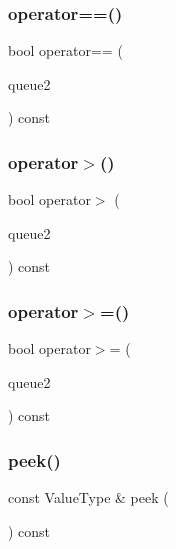 \mbox{\label{classQueue_a85514d93aa9c51e072e2f16ed37ee889}} 
\subsubsection{\texorpdfstring{operator==()}{operator==()}}
{\footnotesize\ttfamily bool operator== (\begin{DoxyParamCaption}\item[{const \mbox{\hyperlink{classQueue}{Queue}}$<$ Value\+Type $>$ \&}]{queue2 }\end{DoxyParamCaption}) const}

\mbox{\label{classQueue_afb42a4f29f0857da53e102eb8f77eea6}} 
\subsubsection{\texorpdfstring{operator$>$()}{operator>()}}
{\footnotesize\ttfamily bool operator$>$ (\begin{DoxyParamCaption}\item[{const \mbox{\hyperlink{classQueue}{Queue}}$<$ Value\+Type $>$ \&}]{queue2 }\end{DoxyParamCaption}) const}

\mbox{\label{classQueue_ad18096c65e1e4666a4103b559d2c2acd}} 
\subsubsection{\texorpdfstring{operator$>$=()}{operator>=()}}
{\footnotesize\ttfamily bool operator$>$= (\begin{DoxyParamCaption}\item[{const \mbox{\hyperlink{classQueue}{Queue}}$<$ Value\+Type $>$ \&}]{queue2 }\end{DoxyParamCaption}) const}

\mbox{\label{classQueue_a74501ededf728c31068dd28a70a8a1f2}} 
\subsubsection{\texorpdfstring{peek()}{peek()}}
{\footnotesize\ttfamily const Value\+Type \& peek (\begin{DoxyParamCaption}{ }\end{DoxyParamCaption}) const}


